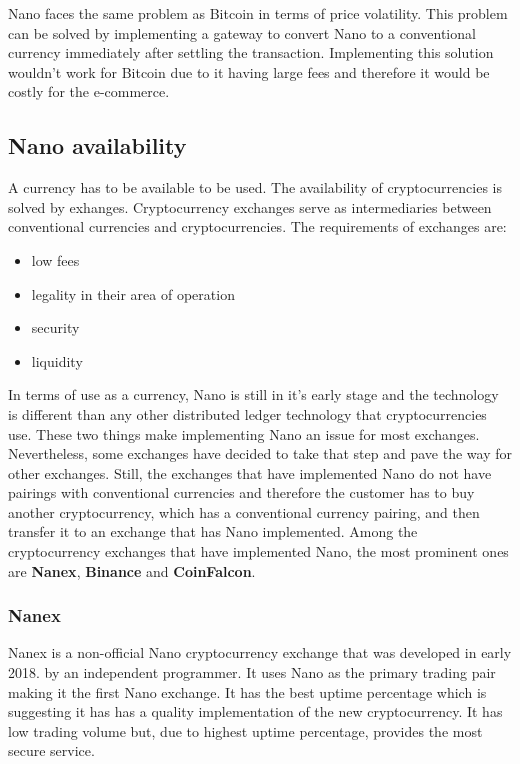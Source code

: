 \documentclass{ferseminar}
\begin{document}
Nano faces the same problem as Bitcoin in terms of price volatility. This problem can be solved by implementing a gateway to convert Nano to a conventional currency immediately after settling the transaction. Implementing this solution wouldn't work for Bitcoin due to it having large fees and therefore it would be costly for the e-commerce. 
\subsection{Nano availability}

A currency has to be available to be used. The availability of cryptocurrencies is solved by exhanges. Cryptocurrency exchanges serve as intermediaries between conventional currencies and cryptocurrencies. The requirements of exchanges are:
\begin{itemize}
	\item low fees
	\item legality in their area of operation
	\item security
	\item liquidity
\end{itemize}

In terms of use as a currency, Nano is still in it's early stage and the technology is different than any other distributed ledger technology that cryptocurrencies use. These two things make implementing Nano an issue for most exchanges. Nevertheless, some exchanges have decided to take that step and pave the way for other exchanges. Still, the exchanges that have implemented Nano do not have pairings with conventional currencies and therefore the customer has to buy another cryptocurrency, which has a conventional currency pairing, and then transfer it to an exchange that has Nano implemented. Among the cryptocurrency exchanges that have implemented Nano, the most prominent ones are \textbf{Nanex}, \textbf{Binance} and \textbf{CoinFalcon}.

\subsubsection{Nanex}
Nanex is a non-official Nano cryptocurrency exchange that was developed in early 2018. by an independent programmer. It uses Nano as the primary trading pair making it the first Nano exchange. It has the best uptime percentage which is suggesting it has has a quality implementation of the new cryptocurrency. It has low trading volume but, due to highest uptime percentage, provides the most secure service.
\end{document}
